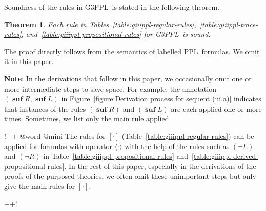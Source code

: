 \documentclass[manuscript,screen]{acmart}
\newtheorem{theorem}{Theorem}[section]
\newcommand{\la}[0]{\langle}
\newcommand{\ra}[0]{\rangle}
\DeclareMathOperator{\cho}{\cup}
\newcommand{\GiiiPPL}[0]{\mbox{G3PPL}}
\DeclareMathOperator{\osuf}{\mathbf{suf}}
\newcommand{\PPL}[0]{\mbox{PPL}}
\begin{document}
Soundness of the rules in \GiiiPPL\ is stated in the following theorem. 

\begin{theorem}
    \label{theo:Soundness of Each Rule of GiiiPPL}
Each rule in Tables~\ref{table:giiippl-regular-rules},~\ref{table:giiippl-trace-rules}, and~\ref{table:giiippl-propositional-rules} for \GiiiPPL\ is sound.

\end{theorem}

The proof directly follows from the semantics of labelled \PPL\ formulas.  We omit it in this paper. 

\textbf{Note}: 
In the derivations that follow in this paper, we occasionally omit one or more intermediate steps to save space. For example, the annotation $(\osuf R, \osuf L)$ in Figure~\ref{figure:Derivation process for sequent (iii.a)} indicates that instances of the rules $(\osuf R)$ and $(\osuf L)$ are each applied one or more times. Sometimes, we list only the main rule applied. 

\ifx
!++
@word @mini
The rules for $[\cdot]$ (Table~\ref{table:giiippl-regular-rules}) can be applied for formulas with operator $\la\cdot\ra$ with the help of the rules such as $(\neg L)$ and $(\neg R)$ in Table~\ref{table:giiippl-propositional-rules} and~\ref{table:giiippl-derived-propositional-rules}. 
In the rest of this paper, especially in the derivations of the proofs of the purposed theories, we often omit these unimportant steps but only give the main rules for $[\cdot]$. 



++!
\fi
\end{document}

